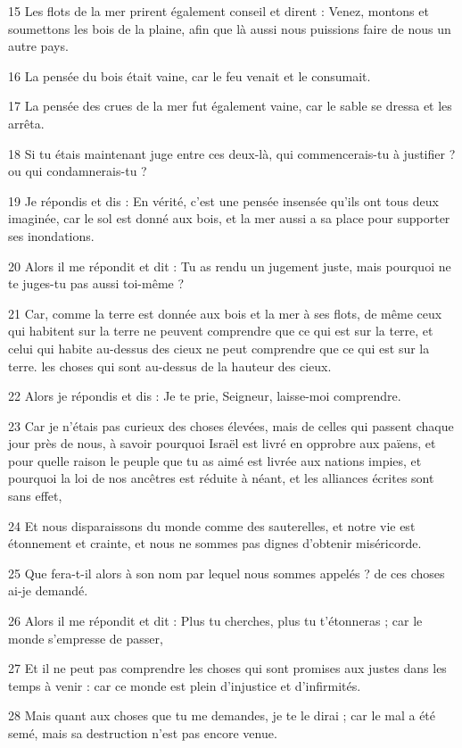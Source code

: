 \par 15 Les flots de la mer prirent également conseil et dirent : Venez, montons et soumettons les bois de la plaine, afin que là aussi nous puissions faire de nous un autre pays.
\par 16 La pensée du bois était vaine, car le feu venait et le consumait.
\par 17 La pensée des crues de la mer fut également vaine, car le sable se dressa et les arrêta.
\par 18 Si tu étais maintenant juge entre ces deux-là, qui commencerais-tu à justifier ? ou qui condamnerais-tu ?
\par 19 Je répondis et dis : En vérité, c'est une pensée insensée qu'ils ont tous deux imaginée, car le sol est donné aux bois, et la mer aussi a sa place pour supporter ses inondations.
\par 20 Alors il me répondit et dit : Tu as rendu un jugement juste, mais pourquoi ne te juges-tu pas aussi toi-même ?
\par 21 Car, comme la terre est donnée aux bois et la mer à ses flots, de même ceux qui habitent sur la terre ne peuvent comprendre que ce qui est sur la terre, et celui qui habite au-dessus des cieux ne peut comprendre que ce qui est sur la terre. les choses qui sont au-dessus de la hauteur des cieux.
\par 22 Alors je répondis et dis : Je te prie, Seigneur, laisse-moi comprendre.
\par 23 Car je n'étais pas curieux des choses élevées, mais de celles qui passent chaque jour près de nous, à savoir pourquoi Israël est livré en opprobre aux païens, et pour quelle raison le peuple que tu as aimé est livrée aux nations impies, et pourquoi la loi de nos ancêtres est réduite à néant, et les alliances écrites sont sans effet,
\par 24 Et nous disparaissons du monde comme des sauterelles, et notre vie est étonnement et crainte, et nous ne sommes pas dignes d'obtenir miséricorde.
\par 25 Que fera-t-il alors à son nom par lequel nous sommes appelés ? de ces choses ai-je demandé.
\par 26 Alors il me répondit et dit : Plus tu cherches, plus tu t'étonneras ; car le monde s'empresse de passer,
\par 27 Et il ne peut pas comprendre les choses qui sont promises aux justes dans les temps à venir : car ce monde est plein d'injustice et d'infirmités.
\par 28 Mais quant aux choses que tu me demandes, je te le dirai ; car le mal a été semé, mais sa destruction n'est pas encore venue.
